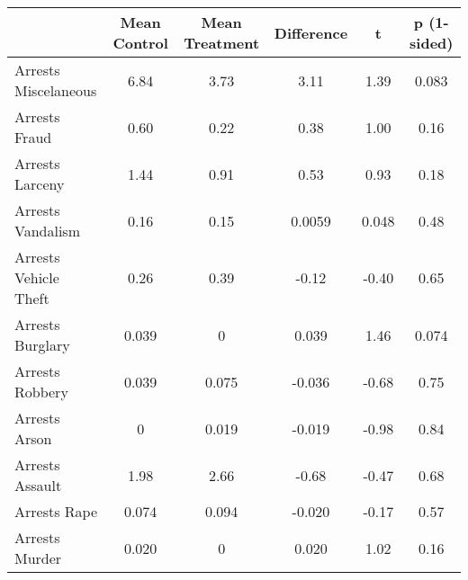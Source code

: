 {
\def\sym#1{\ifmmode^{#1}\else\(^{#1}\)\fi}
\begin{tabular}{l*{1}{ccccc}}
\hline\hline
                    &Mean Control&Mean Treatment&  Difference&           t& p (1-sided)\\
\hline
Arrests Miscelaneous &        6.84&        3.73&        3.11&        1.39&       0.083\\
Arrests Fraud       &        0.60&        0.22&        0.38&        1.00&        0.16\\
Arrests Larceny     &        1.44&        0.91&        0.53&        0.93&        0.18\\
Arrests Vandalism   &        0.16&        0.15&      0.0059&       0.048&        0.48\\
Arrests Vehicle Theft &        0.26&        0.39&       -0.12&       -0.40&        0.65\\
Arrests Burglary    &       0.039&           0&       0.039&        1.46&       0.074\\
Arrests Robbery     &       0.039&       0.075&      -0.036&       -0.68&        0.75\\
Arrests Arson       &           0&       0.019&      -0.019&       -0.98&        0.84\\
Arrests Assault     &        1.98&        2.66&       -0.68&       -0.47&        0.68\\
Arrests Rape        &       0.074&       0.094&      -0.020&       -0.17&        0.57\\
Arrests Murder      &       0.020&           0&       0.020&        1.02&        0.16\\
\hline\hline
\end{tabular}
}
